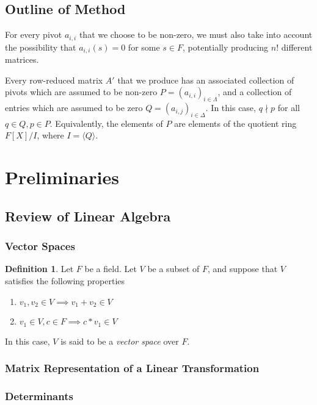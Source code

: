 \documentclass{amsart}
\theoremstyle{definition}
\newtheorem{definition}[theorem]{Definition}
\theoremstyle{remark}
\numberwithin{equation}{section}
\begin{document}
\subsection{Outline of Method}

For every pivot $a_{i,i}$ that we choose to be non-zero, we must also take into account the possibility that $a_{i,i}(s) = 0$ for some $s \in F$, potentially producing $n!$ different matrices.

Every row-reduced matrix $A'$ that we produce has an associated collection of pivots which are assumed to be non-zero $P = (a_{i,i})_{i \in \Lambda}$, and a collection of entries which are assumed to be zero $Q = (a_{i,j})_{i \in \Delta}$. In this case, $q \nmid p$ for all $q \in Q, p \in P$. Equivalently, the elements of $P$ are elements of the quotient ring $F[X]/I$, where $I = \langle Q \rangle$.

\section{Preliminaries}
\label{sec:preliminaries}

\subsection{Review of Linear Algebra}

\subsubsection{Vector Spaces}

\begin{definition}
    Let $F$ be a field. Let $V$ be a subset of $F$, and suppose that $V$
    satisfies the following properties
    \begin{enumerate}[i]
        \item $v_1, v_2 \in V \implies v_1 + v_2 \in V$
        \item $v_1 \in V, c \in F \implies c * v_1 \in V$
    \end{enumerate}
    In this case, $V$ is said to be a \emph{vector space} over $F$.
\end{definition}

\subsubsection{Matrix Representation of a Linear Transformation}

\subsubsection{Determinants}
\end{document}
